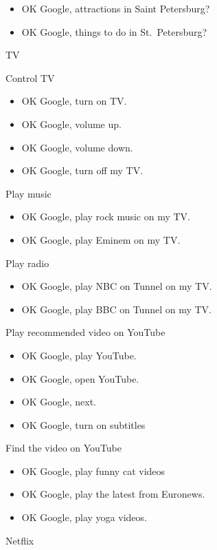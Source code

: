 \documentclass[
  a4paper,
]{article}
\begin{document}
\begin{itemize}
\item
  OK Google, attractions in Saint Petersburg?
\item
  OK Google, things to do in St.~Petersburg?
\end{itemize}

TV

Control TV

\begin{itemize}
\item
  OK Google, turn on TV.
\item
  OK Google, volume up.
\item
  OK Google, volume down.
\item
  OK Google, turn off my TV.
\end{itemize}

Play music

\begin{itemize}
\item
  OK Google, play rock music on my TV.
\item
  OK Google, play Eminem on my TV.
\end{itemize}

Play radio

\begin{itemize}
\item
  OK Google, play NBC on Tunnel on my TV.
\item
  OK Google, play BBC on Tunnel on my TV.
\end{itemize}

Play recommended video on YouTube

\begin{itemize}
\item
  OK Google, play YouTube.
\item
  OK Google, open YouTube.
\item
  OK Google, next.
\item
  OK Google, turn on subtitles
\end{itemize}

Find the video on YouTube

\begin{itemize}
\item
  OK Google, play funny cat videos
\item
  OK Google, play the latest from Euronews.
\item
  OK Google, play yoga videos.
\end{itemize}

Netflix
\end{document}
